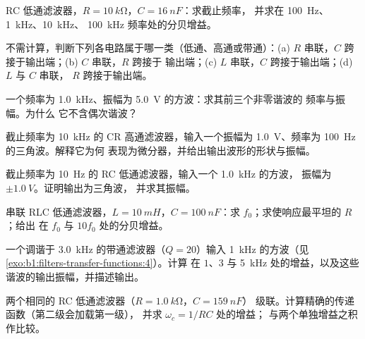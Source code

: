 \begin{exercise}[$\star$]\label{exo:b1:filters-transfer-functions:2}
RC 低通滤波器，$R = \qty{10}{k\ohm}$，$C = \qty{16}{nF}$：求截止频率，
并求在 \qty{100}{Hz}、\qty{1}{kHz}、\qty{10}{kHz}、
\qty{100}{kHz} 频率处的分贝增益。
\end{exercise}

\begin{exercise}[$\star$]\label{exo:b1:filters-transfer-functions:3}
不需计算，判断下列各电路属于哪一类（低通、高通或带通）：(a)
$R$ 串联，$C$ 跨接于输出端；(b) $C$ 串联，$R$ 跨接于
输出端；(c) $L$ 串联，$C$ 跨接于输出端；(d) $L$ 与 $C$ 串联，
$R$ 跨接于输出端。
\end{exercise}

\begin{exercise}[$\star$]\label{exo:b1:filters-transfer-functions:4}
一个频率为 \qty{1.0}{kHz}、振幅为 \qty{5.0}{V} 的方波：求其前三个非零谐波的
频率与振幅。为什么
它不含偶次谐波？
\end{exercise}

\begin{exercise}[$\star\star$]\label{exo:b1:filters-transfer-functions:5}
截止频率为 \qty{10}{kHz} 的 CR 高通滤波器，输入一个振幅为
\qty{1.0}{V}、频率为 \qty{100}{Hz} 的三角波。解释它为何
表现为微分器，并给出输出波形的形状与振幅。
\end{exercise}

\begin{exercise}[$\star\star$]\label{exo:b1:filters-transfer-functions:6}
截止频率为 \qty{10}{Hz} 的 RC 低通滤波器，输入一个 \qty{1.0}{kHz} 的方波，
振幅为 $\pm\qty{1.0}{V}$。证明输出为三角波，
并求其振幅。
\end{exercise}

\begin{exercise}[$\star\star$]\label{exo:b1:filters-transfer-functions:7}
串联 RLC 低通滤波器，$L = \qty{10}{mH}$，$C = \qty{100}{nF}$：求
$f_0$；求使响应最平坦的 $R$；给出
在 $f_0$ 与 $10f_0$ 处的分贝增益。
\end{exercise}

\begin{exercise}[$\star\star$]\label{exo:b1:filters-transfer-functions:8}
一个调谐于 \qty{3.0}{kHz} 的带通滤波器（$Q = 20$）输入
\qty{1}{kHz} 的方波（见\cref{exo:b1:filters-transfer-functions:4}）。计算
在 $1$、$3$ 与 \qty{5}{kHz} 处的增益，以及这些
谐波的输出振幅，并描述输出。
\end{exercise}

\begin{exercise}[$\star\star$]\label{exo:b1:filters-transfer-functions:9}
两个相同的 RC 低通滤波器（$R = \qty{1.0}{k\ohm}$，$C = \qty{159}{nF}$）
级联。计算精确的传递函数（第二级会加载第一级），
并求 $\omega_c = 1/RC$ 处的增益；
与两个单独增益之积作比较。
\end{exercise}

